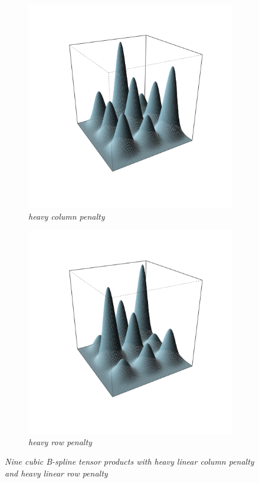 \documentclass[12pt]{article}
\theoremstyle{definition}
\begin{document}
\begin{figure}[H] \label{fig:2d_PS_penalty_demo}
 \begin{subfigure}{.48\textwidth}
  \centering
   \graphicspath{{img/}}
 \includegraphics[scale=0.5]{"model selection/effective dimension/2d_PS_section_figure1_big_col_lambda"}
 \caption{\textit{heavy column penalty}}
 \label{fig:2D_PS_big_col_penalty}
 \end{subfigure}
 \begin{subfigure}{.48\textwidth}
  \centering
   \graphicspath{{img/}}
  \includegraphics[scale=0.5]{"model selection/effective dimension/2d_PS_section_figure1_big_row_lambda"}
 \caption{\textit{heavy row penalty}}
\label{fig:2D_PS_big_row_penalty}
 \end{subfigure}
 \caption{\textit{Nine cubic B-spline tensor products with heavy linear column penalty and heavy linear row penalty}}
\end{figure}
\end{document}

